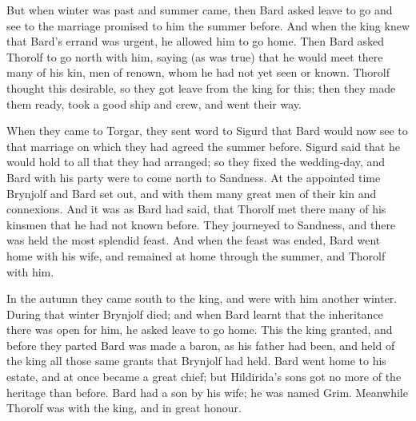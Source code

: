 But when winter was past and summer came, then Bard asked leave to go and see to the marriage promised to him the summer before. And when the king knew that Bard's errand was urgent, he allowed him to go home. Then Bard asked Thorolf to go north with him, saying (as was true) that he would meet there many of his kin, men of renown, whom he had not yet seen or known. Thorolf thought this desirable, so they got leave from the king for this; then they made them ready, took a good ship and crew, and went their way.

When they came to Torgar, they sent word to Sigurd that Bard would now see to that marriage on which they had agreed the summer before. Sigurd said that he would hold to all that they had arranged; so they fixed the wedding-day, and Bard with his party were to come north to Sandness. At the appointed time Brynjolf and Bard set out, and with them many great men of their kin and connexions. And it was as Bard had said, that Thorolf met there many of his kinsmen that he had not known before. They journeyed to Sandness, and there was held the most splendid feast. And when the feast was ended, Bard went home with his wife, and remained at home through the summer, and Thorolf with him.

In the autumn they came south to the king, and were with him another winter. During that winter Brynjolf died; and when Bard learnt that the inheritance there was open for him, he asked leave to go home. This the king granted, and before they parted Bard was made a baron, as his father had been, and held of the king all those same grants that Brynjolf had held. Bard went home to his estate, and at once became a great chief; but Hildirida's sons got no more of the heritage than before. Bard had a son by his wife; he was named Grim. Meanwhile Thorolf was with the king, and in great honour.
